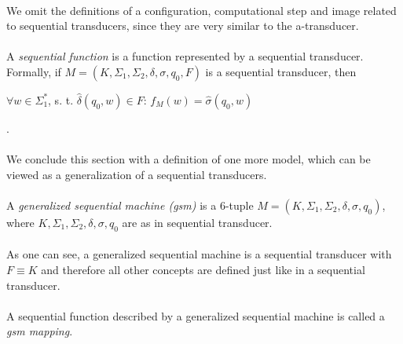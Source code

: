 \paragraph{}
We omit the definitions of a configuration, computational step and image related to sequential transducers, since they are very similar to the a-transducer.

\paragraph{}
 A \emph{sequential function} is a function represented by a sequential transducer. Formally, if $M=(K, \Sigma_{1}, \Sigma_{2}, \delta, \sigma, q_{0}, F)$ is a sequential transducer, then \\
\centerline{$\forall w \in \Sigma_{1}^{*}$, s. t. $\hat{\delta}(q_{0}, w) \in F$: $f_{M}(w) = \hat{\sigma}(q_{0}, w)$}.

\paragraph{}
We conclude this section with a definition of one more model, which can be viewed as a generalization of a sequential transducers.

\paragraph{}
 A \emph{generalized sequential machine (gsm)} is a 6-tuple $M=(K, \Sigma_{1}, \Sigma_{2}, \delta, \sigma, q_{0})$, where $K, \Sigma_{1}, \Sigma_{2}, \delta, \sigma, q_{0}$ are as in sequential transducer.

\paragraph{}
As one can see, a generalized sequential machine is a sequential transducer with $F \equiv K$ and therefore all other concepts are defined just like in a sequential transducer.

\paragraph{}
\oznacenie A sequential function described by a generalized sequential machine is called a \emph{gsm mapping}.

\paragraph{}
